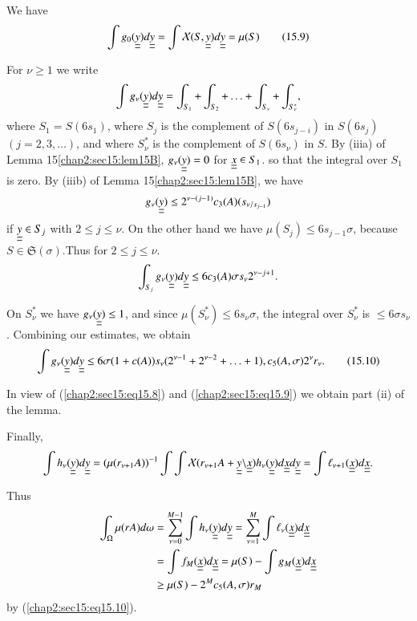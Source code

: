 We have
\begin{equation*}
\int g_{0} (\underline{\underline{y}}) d\underline{\underline{y}} = \int \mathcal{X} (S, \underline{\underline{y}}) d\underline{\underline{y}} = \mu(S)\tag{15.9}\label{chap2:sec15:eq15.9}
\end{equation*}

For $\nu \geq 1$ we write
$$
\int g_{\nu} (\underline{\underline{y}}) d\underline{\underline{y}} = \int_{S_{1}} + \int_{S_{2}} + \ldots + \int_{S_{\nu}} + \int_{S_{\nu}^{*}},
$$
where $S_{1} = S(6s_{1})$, where $S_{j}$ is the complement of $S(6s_{j-i})$ in $S(6s_{j})$ $(j = 2, 3, \ldots)$, and where $S_{\nu}^{*}$ is the complement of $S(6s_{\nu})$ in $S$. By (iiia) of Lemma 15\ref{chap2:sec15:lem15B}, $g_{\nu} (\underline{\underline{y}}) = 0$ for $\underline{\underline{x}} \in S_{1}$. so that the integral over $S_{1}$ is zero. By (iiib) of Lemma 15\ref{chap2:sec15:lem15B}, we have
$$
g_{\nu}(\underline{\underline{y}}) \leq 2^{\nu-(j-1)} c_{3} (A) (s_{\nu/ s_{j-1}})
$$
if $\underline{\underline{y}} \in S_{j}$ with $2 \leq j \leq \nu$. On the other hand we have $\mu(S_{j}) \leq 6s_{j-1} \sigma$, because $S \in \mathfrak{S} (\sigma)$.\pageoriginale Thus for $2 \leq j \leq \nu$.
$$
\int_{S_{j}} g_{\nu} (\underline{\underline{y}}) d\underline{\underline{y}} \leq 6 c_{3} (A) \sigma s_{\nu} 2^{\nu - j + 1}.
$$

On $S_{\nu}^{*}$ we have $g_{\nu}(\underline{\underline{y}}) \leq 1$, and since $\mu(S_{\nu}^{*}) \leq 6 s_{\nu} \sigma$, the integral over $S_{\nu}^{*}$ is $\leq 6 \sigma s_{\nu}$. Combining our estimates, we obtain
\begin{equation*}
\int g_{\nu} (\underline{\underline{y}}) d\underline{\underline{y}} \leq 6\sigma (1+c(A)) s_{\nu} (2^{\nu-1} + 2^{\nu-2} + \ldots + 1), c_{5} (A, \sigma)2^{\nu} r_{\nu}.\tag{15.10}\label{chap2:sec15:eq15.10}
\end{equation*}

In view of (\ref{chap2:sec15:eq15.8}) and (\ref{chap2:sec15:eq15.9}) we obtain part (ii) of the lemma.

Finally, 
{\fontsize{10}{12}\selectfont
$$
\int h_{\nu} (\underline{\underline{y}}) d\underline{\underline{y}} = (\mu(r_{\nu+1} A))^{-1} \int \int
\mathcal{X} (r_{\nu+1} A + \underline{\underline{y}} \backslash \underline{\underline{x}}) h_{\nu}
(\underline{\underline{y}}) d\underline{\underline{x}} d\underline{\underline{y}} = \int \ell_{\nu+1} (\underline{\underline{x}}) d\underline{\underline{x}}. 
$$}\relax

Thus
\begin{align*}
\int_{\Omega} \mu(rA) d\omega & = \sum_{\nu=0}^{M-1} \int h_{\nu} (\underline{\underline{y}}) d\underline{\underline{y}} = \sum_{\nu=1}^{M} \int \ell_{\nu} (\underline{\underline{x}}) d\underline{\underline{x}}\\
& = \int f_{M} (\underline{\underline{x}}) d\underline{\underline{x}} = \mu(S) - \int g_{M} (\underline{\underline{x}}) d\underline{\underline{x}}\\
& \geq \mu(S) - 2^{M} c_{5} (A, \sigma) r_{M}
\end{align*}
by (\ref{chap2:sec15:eq15.10}).

